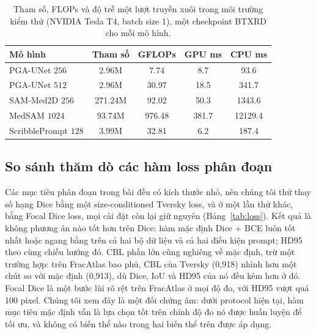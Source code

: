 \documentclass[11pt]{article}
\begin{document}
\begin{table}[H]
\caption{Tham số, FLOPs và độ trễ một lượt truyền xuôi trong môi trường kiểm thử (NVIDIA Tesla T4, batch size 1), một checkpoint BTXRD cho mỗi mô hình.}
\label{tab:efficiency}
\centering
\scriptsize
\begin{tabular}{lcccc}
\toprule
Mô hình & Tham số & GFLOPs & GPU ms & CPU ms \\
\midrule
PGA-UNet $256$ & 2.96M & 7.74 & 8.7 & 93.6 \\
PGA-UNet $512$ & 2.96M & 30.97 & 18.5 & 341.7 \\
SAM-Med2D $256$ & 271.24M & 92.02 & 50.3 & 1343.6 \\
MedSAM $1024$ & 93.74M & 976.48 & 381.7 & 12129.4 \\
ScribblePrompt $128$ & 3.99M & 32.81 & 6.2 & 187.4 \\
\bottomrule
\end{tabular}
\end{table}

\subsection{So sánh thăm dò các hàm loss phân đoạn}
Các mục tiêu phân đoạn trong bài đều có kích thước nhỏ, nên chúng tôi thử thay số hạng Dice bằng một size-conditioned Tversky loss, và ở một lần thử khác, bằng Focal Dice loss, mọi cài đặt còn lại giữ nguyên (Bảng~\ref{tab:loss}). Kết quả là không phương án nào tốt hơn trên Dice: hàm mặc định Dice + BCE luôn tốt nhất hoặc ngang bằng trên cả hai bộ dữ liệu và cả hai điều kiện prompt; HD95 theo cùng chiều hướng đó. CBL phần lớn cũng nghiêng về mặc định, trừ một trường hợp: trên FracAtlas bao phủ, CBL của Tversky (0,918) nhỉnh hơn một chút so với mặc định (0,913), dù Dice, IoU và HD95 của nó đều kém hơn ở đó. Focal Dice là một bước lùi rõ rệt trên FracAtlas ở mọi độ đo, với HD95 vượt quá 100 pixel. Chúng tôi xem đây là một đối chứng âm: dưới protocol hiện tại, hàm mục tiêu mặc định vẫn là lựa chọn tốt trên chính độ đo nó được huấn luyện để tối ưu, và không có biến thể nào trong hai biến thể trên được áp dụng.
\end{document}
